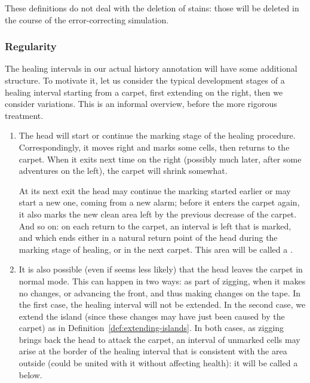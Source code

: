 \documentclass[12pt]{memoir}
\begin{document}
These definitions do not deal with the deletion of stains: those will be deleted in the course
of the error-correcting simulation.


\subsubsection{Regularity}

The healing intervals in our actual history annotation will
have some additional structure.
To motivate it, let us consider the typical development stages of a healing
interval starting from a carpet, first extending on
the right, then we consider variations.
This is an informal overview, before the more rigorous treatment.

\begin{enumerate}
\item\label{i:outline.mark} The head will start or continue the marking stage of 
the healing procedure.
Correspondingly, it moves right and marks some cells, then returns to the carpet.
When it exits next time on the right 
(possibly much later, after some adventures on the left), the carpet will shrink somewhat.

At its next exit the head may continue the marking started earlier or may start a new one,
coming from a new alarm; before it enters the carpet again, it also 
marks the new clean area left by the previous decrease of the carpet.
And so on: on each return to the carpet, an interval is left that is marked,
and which ends either in a natural return point of the head during the marking
stage of healing, or in the next carpet.
This area will be called a .

\item\label{i:outline.border-zone} 
It is also possible (even if seems less likely) that the head leaves the carpet
in normal mode.
This can happen in two ways: as part of zigging, when it makes no changes,
or advancing the front, and thus making changes on the tape.
In the first case, the healing interval will not be extended.
In the second case, we extend the island (since these changes may have
just been caused by the carpet) as in Definition~\ref{def:extending-islands}.
In both cases, as zigging brings back the head to attack the carpet,
an interval of unmarked cells may arise at the border of the healing
interval that is consistent with the area outside (could be united with it without
affecting health): it will be called a  below.


\end{enumerate}
\end{document}
